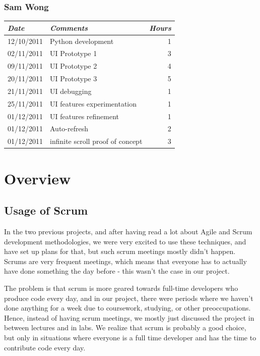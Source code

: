 \documentclass[a4paper,12pt]{article}
\begin{document}
	  \subsubsection{Sam Wong}
	  \begin{tabular}{l | p{10cm} r}
     \emph{\large Date} & \emph{\large Comments} & \emph{\large Hours}\\
     \hline
	   12/10/2011 & Python development & 1\\
     02/11/2011 & UI Prototype 1 & 3\\
     09/11/2011 & UI Prototype 2 & 4\\
     20/11/2011 & UI Prototype 3 & 5\\
     21/11/2011 & UI debugging & 1\\
     25/11/2011 & UI features experimentation & 1\\
     01/12/2011 & UI features refinement & 1\\
     01/12/2011 & Auto-refresh & 2\\
     01/12/2011 & infinite scroll proof of concept & 3\\
    \end{tabular}

		\section{Overview}
		
		\subsection{Usage of Scrum}
		
		In the two previous projects, and after having read a lot about Agile and Scrum development methodologies, we were very excited to use these techniques, and have set up plans for that, but such scrum meetings mostly didn't happen. Scrums are very frequent meetings, which means that everyone has to actually have done something the day before - this wasn't the case in our project.
		
		The problem is that scrum is more geared towards full-time developers who produce code every day, and in our project, there were periods where we haven't done anything for a week due to coursework, studying, or other preoccupations. Hence, instead of having scrum meetings, we mostly just discussed the project in between lectures and in labs. We realize that scrum is probably a good choice, but only in situations where everyone is a full time developer and has the time to contribute code every day.
  
\end{document}
